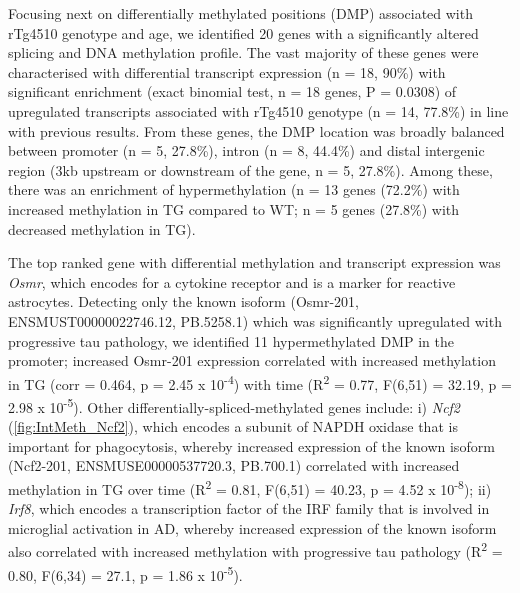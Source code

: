 Focusing next on differentially methylated positions (DMP) associated with rTg4510 genotype and age, we identified 20 genes with a significantly altered splicing and DNA methylation profile. The vast majority of these genes were characterised with differential transcript expression (n = 18, 90\%) with significant enrichment (exact binomial test, n = 18 genes, P = 0.0308) of upregulated transcripts associated with rTg4510 genotype (n = 14, 77.8\%) in line with previous results. From these genes, the DMP location was broadly balanced between promoter (n = 5, 27.8\%), intron (n = 8, 44.4\%) and distal intergenic region (3kb upstream or downstream of the gene, n = 5, 27.8\%). Among these, there was an enrichment of hypermethylation (n = 13 genes (72.2\%) with increased methylation in TG compared to WT; n = 5 genes (27.8\%) with decreased methylation in TG).  

The top ranked gene with differential methylation and transcript expression was \textit{Osmr}, which encodes for a cytokine receptor and is a marker for reactive astrocytes. Detecting only the known isoform (Osmr-201, ENSMUST00000022746.12, PB.5258.1) which was significantly upregulated with progressive tau pathology, we identified 11 hypermethylated DMP in the promoter; increased Osmr-201 expression correlated with increased methylation in TG (corr = 0.464, p = 2.45 x 10\textsuperscript{-4}) with time (R\textsuperscript{2} = 0.77, F(6,51) = 32.19, p = 2.98 x 10\textsuperscript{-5}). Other differentially-spliced-methylated genes include: i) \textit{Ncf2} (\cref{fig:IntMeth_Ncf2}), which encodes a subunit of NAPDH oxidase that is important for phagocytosis, whereby increased expression of the known isoform (Ncf2-201, ENSMUSE00000537720.3, PB.700.1) correlated with increased methylation in TG over time (R\textsuperscript{2} = 0.81, F(6,51) = 40.23, p = 4.52 x 10\textsuperscript{-8}); ii) \textit{Irf8}, which encodes a transcription factor of the IRF family that is involved in microglial activation in AD\cite{Zeng2017}, whereby increased expression of the known isoform also correlated with increased methylation with progressive tau pathology (R\textsuperscript{2} = 0.80, F(6,34) = 27.1, p = 1.86 x 10\textsuperscript{-5}). 


